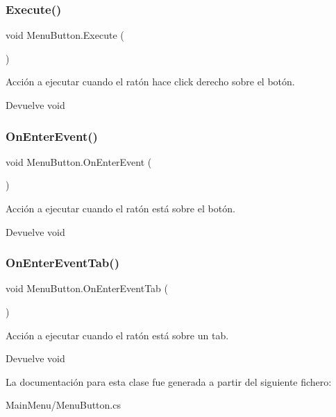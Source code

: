 \subsubsection{\texorpdfstring{Execute()}{Execute()}}
{\footnotesize\ttfamily void Menu\+Button.\+Execute (\begin{DoxyParamCaption}{ }\end{DoxyParamCaption})\hspace{0.3cm}{\ttfamily [inline]}}

Acción a ejecutar cuando el ratón hace click derecho sobre el botón. \begin{DoxyReturn}{Devuelve}
void 
\end{DoxyReturn}
\mbox{\label{class_menu_button_ab023310f5a656d619dba3d006df55520}} 
\subsubsection{\texorpdfstring{OnEnterEvent()}{OnEnterEvent()}}
{\footnotesize\ttfamily void Menu\+Button.\+On\+Enter\+Event (\begin{DoxyParamCaption}{ }\end{DoxyParamCaption})\hspace{0.3cm}{\ttfamily [inline]}}

Acción a ejecutar cuando el ratón está sobre el botón. \begin{DoxyReturn}{Devuelve}
void 
\end{DoxyReturn}
\mbox{\label{class_menu_button_ab62a32b6f3e254a883de5bb7ad6007dc}} 
\subsubsection{\texorpdfstring{OnEnterEventTab()}{OnEnterEventTab()}}
{\footnotesize\ttfamily void Menu\+Button.\+On\+Enter\+Event\+Tab (\begin{DoxyParamCaption}{ }\end{DoxyParamCaption})\hspace{0.3cm}{\ttfamily [inline]}}

Acción a ejecutar cuando el ratón está sobre un tab. \begin{DoxyReturn}{Devuelve}
void 
\end{DoxyReturn}


La documentación para esta clase fue generada a partir del siguiente fichero\+:\begin{DoxyCompactItemize}
\item 
Main\+Menu/Menu\+Button.\+cs\end{DoxyCompactItemize}
